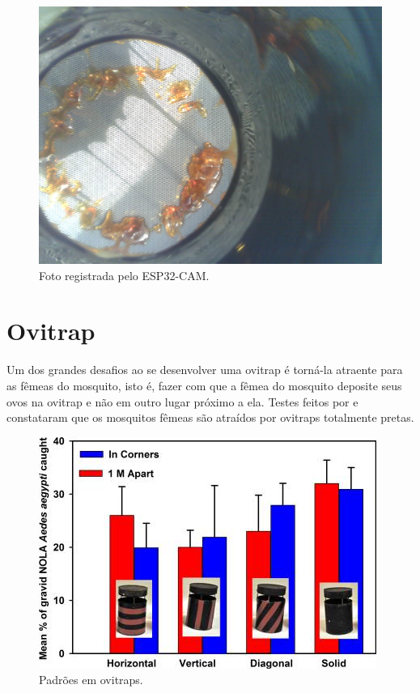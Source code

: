 \documentclass[
	12pt,				%
	openright,			%
	oneside,			%
	a4paper,			%
	chapter=TITLE,		%
	english,			%
	brazil				%
	]{abntex2}
\begin{document}
\begin{figure}[H]
    \centering
    \includegraphics[scale=0.1]{imagens/fotoESP32.jpeg}
    \caption{Foto registrada pelo ESP32-CAM.}
        \label{fig:fotoesp32}
    \end{figure}

\section{Ovitrap}

Um dos grandes desafios ao se desenvolver uma ovitrap é torná-la atraente para as fêmeas do mosquito, isto é, fazer com que a fêmea 
do mosquito deposite seus ovos na ovitrap 
e não em outro lugar próximo a ela. Testes feitos por \cite{DAVIDF2011} e \cite{VALERIE2016} constataram que os mosquitos fêmeas 
são atraídos por ovitraps totalmente pretas.

\begin{figure}[H]
\centering
\includegraphics[scale=0.7]{imagens/tileshop.jpeg}
\caption{Padrões em ovitraps.}
\end{figure}
\end{document}
